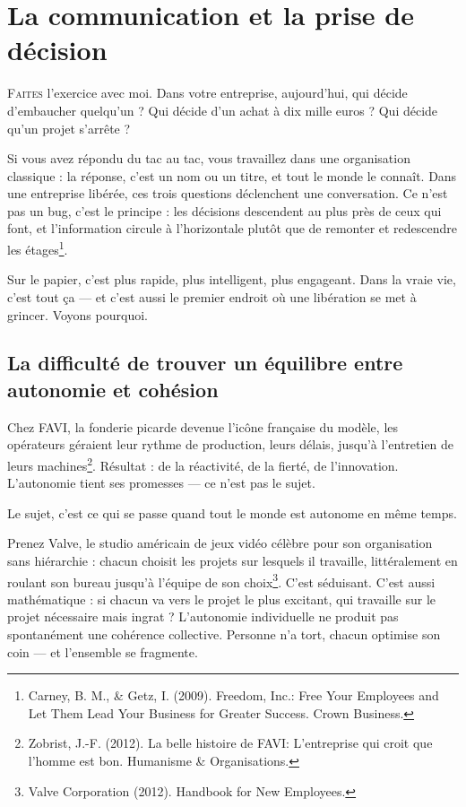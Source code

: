 
\chapter{La communication et la prise de décision}

\lettrine[lines=2]{F}{aites} l'exercice avec moi. Dans votre entreprise, aujourd'hui, qui décide d'embaucher quelqu'un ? Qui décide d'un achat à dix mille euros ? Qui décide qu'un projet s'arrête ?

Si vous avez répondu du tac au tac, vous travaillez dans une organisation classique : la réponse, c'est un nom ou un titre, et tout le monde le connaît. Dans une entreprise libérée, ces trois questions déclenchent une conversation. Ce n'est pas un bug, c'est le principe : les décisions descendent au plus près de ceux qui font, et l'information circule à l'horizontale plutôt que de remonter et redescendre les étages\footnote{Carney, B. M., \& Getz, I. (2009). Freedom, Inc.: Free Your Employees and Let Them Lead Your Business for Greater Success. Crown Business.}.

Sur le papier, c'est plus rapide, plus intelligent, plus engageant. Dans la vraie vie, c'est tout ça — et c'est aussi le premier endroit où une libération se met à grincer. Voyons pourquoi.

\section{La difficulté de trouver un équilibre entre autonomie et cohésion}

Chez FAVI, la fonderie picarde devenue l'icône française du modèle, les opérateurs géraient leur rythme de production, leurs délais, jusqu'à l'entretien de leurs machines\footnote{Zobrist, J.-F. (2012). La belle histoire de FAVI: L'entreprise qui croit que l'homme est bon. Humanisme \& Organisations.}. Résultat : de la réactivité, de la fierté, de l'innovation. L'autonomie tient ses promesses — ce n'est pas le sujet.

Le sujet, c'est ce qui se passe quand tout le monde est autonome en même temps.

Prenez Valve, le studio américain de jeux vidéo célèbre pour son organisation sans hiérarchie : chacun choisit les projets sur lesquels il travaille, littéralement en roulant son bureau jusqu'à l'équipe de son choix\footnote{Valve Corporation (2012). Handbook for New Employees.}. C'est séduisant. C'est aussi mathématique : si chacun va vers le projet le plus excitant, qui travaille sur le projet nécessaire mais ingrat ? L'autonomie individuelle ne produit pas spontanément une cohérence collective. Personne n'a tort, chacun optimise son coin — et l'ensemble se fragmente.


